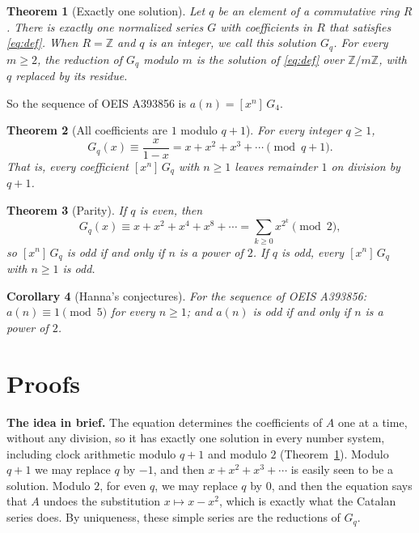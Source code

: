 \documentclass[11pt,a4paper]{article}
\newtheorem{theorem}{Theorem}[section]
\newtheorem{corollary}[theorem]{Corollary}
\theoremstyle{definition}
\theoremstyle{remark}
\newcommand{\Z}{\mathbb{Z}}
\newcommand{\coeff}[2]{[x^{#1}]\,#2}
\newcommand{\para}[1]{\par\medskip\noindent\textbf{#1}\enspace}
\begin{document}
\begin{theorem}[Exactly one solution]\label{thm:exist}
Let $q$ be an element of a commutative ring $R$. There is exactly one normalized series $G$ with coefficients in $R$
that satisfies \eqref{eq:def}. When $R=\Z$ and $q$ is an integer, we call this solution $G_q$. For every $m\ge2$, the
reduction of $G_q$ modulo $m$ is the solution of \eqref{eq:def} over $\Z/m\Z$, with $q$ replaced by its residue.
\end{theorem}

So the sequence of OEIS A393856 is $a(n)=\coeff{n}{G_{4}}$.

\begin{theorem}[All coefficients are $1$ modulo $q+1$]\label{thm:mod}
For every integer $q\ge1$,
\[
G_q(x)\equiv\frac{x}{1-x}=x+x^2+x^3+\cdots\pmod{q+1}.
\]
That is, every coefficient $\coeff{n}{G_q}$ with $n\ge1$ leaves remainder $1$ on division by $q+1$.
\end{theorem}

\begin{theorem}[Parity]\label{thm:parity}
If $q$ is even, then
\[
G_q(x)\equiv x+x^2+x^4+x^8+\cdots=\sum_{k\ge0}x^{2^k}\pmod 2,
\]
so $\coeff{n}{G_q}$ is odd if and only if $n$ is a power of $2$. If $q$ is odd, every $\coeff{n}{G_q}$ with $n\ge1$
is odd.
\end{theorem}

\begin{corollary}[Hanna's conjectures]\label{cor:oeis}
For the sequence of OEIS A393856: $a(n)\equiv1\pmod{5}$ for every $n\ge1$; and $a(n)$ is odd if and only if $n$ is a power of $2$.
\end{corollary}

\section{Proofs}\label{sec:proofs}

\para{The idea in brief.} The equation determines the coefficients of $A$ one at a time, without any division, so it
has exactly one solution in every number system, including clock arithmetic modulo $q+1$ and modulo $2$
(Theorem~\ref{thm:exist}). Modulo $q+1$ we may replace $q$ by $-1$, and then $x+x^2+x^3+\cdots$ is easily seen to be a
solution. Modulo $2$, for even $q$, we may replace $q$ by $0$, and then the equation says that $A$ undoes the
substitution $x\mapsto x-x^2$, which is exactly what the Catalan series does. By uniqueness, these simple series are
the reductions of $G_q$.
\end{document}
